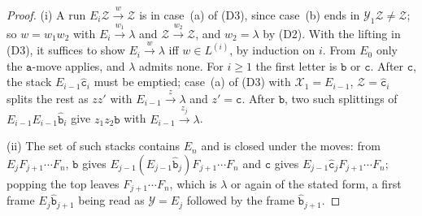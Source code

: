 \documentclass[11pt]{article}
\numberwithin{equation}{section}
\theoremstyle{plain}
\theoremstyle{definition}
\theoremstyle{remark}
\theoremstyle{plain}
\newcommand{\eps}{\lambda}
\begin{document}
\begin{proof}
(i) A run $E_i\mathcal Z\xrightarrow{w}\mathcal Z$ is in case~(a) of (D3), since
case~(b) ends in $\mathcal Y_1\mathcal Z\ne\mathcal Z$; so $w=w_1w_2$ with
$E_i\xrightarrow{w_1}\eps$ and $\mathcal Z\xrightarrow{w_2}\mathcal Z$, and $w_2=\eps$ by
(D2).  With the lifting in (D3), it suffices to show $E_i\xrightarrow{w}\eps$ iff
$w\in L^{(i)}$, by induction on $i$.  From $E_0$ only the $\mathtt a$-move applies,
and $\eps$ admits none.  For $i\ge1$ the first letter is $\mathtt b$ or $\mathtt c$.
After $\mathtt c$, the stack $E_{i-1}\hat{\mathtt c}_i$ must be emptied; case~(a) of
(D3) with $\mathcal X_1=E_{i-1}$, $\mathcal Z=\hat{\mathtt c}_i$ splits the rest as $zz'$
with $E_{i-1}\xrightarrow{z}\eps$ and $z'=\mathtt c$.  After $\mathtt b$, two such
splittings of $E_{i-1}E_{i-1}\hat{\mathtt b}_i$ give $z_1z_2\mathtt b$ with
$E_{i-1}\xrightarrow{z_j}\eps$.

(ii) The set of such stacks contains $E_n$ and is closed under the moves: from
$E_jF_{j+1}\cdots F_n$, $\mathtt b$ gives
$E_{j-1}(E_{j-1}\hat{\mathtt b}_j)F_{j+1}\cdots F_n$ and $\mathtt c$ gives
$E_{j-1}\hat{\mathtt c}_jF_{j+1}\cdots F_n$; popping the top leaves
$F_{j+1}\cdots F_n$, which is $\eps$ or again of the stated form, a first frame
$E_j\hat{\mathtt b}_{j+1}$ being read as $\mathcal Y=E_j$ followed by the frame
$\hat{\mathtt b}_{j+1}$.


\end{proof}
\end{document}
